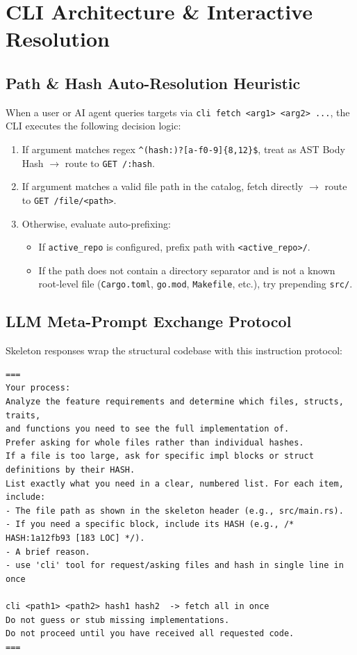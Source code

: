 \documentclass[11pt,a4paper]{article}
\begin{document}
\section{CLI Architecture \& Interactive Resolution}

\subsection{Path \& Hash Auto-Resolution Heuristic}
When a user or AI agent queries targets via \texttt{cli fetch <arg1> <arg2> ...}, the CLI executes the following decision logic:

\begin{enumerate}
    \item If argument matches regex \texttt{\textasciicircum(hash:)?[a-f0-9]\{8,12\}\$}, treat as AST Body Hash $\to$ route to \texttt{GET /:hash}.
    \item If argument matches a valid file path in the catalog, fetch directly $\to$ route to \texttt{GET /file/<path>}.
    \item Otherwise, evaluate auto-prefixing:
    \begin{itemize}
        \item If \texttt{active\_repo} is configured, prefix path with \texttt{<active\_repo>/}.
        \item If the path does not contain a directory separator and is not a known root-level file (\texttt{Cargo.toml}, \texttt{go.mod}, \texttt{Makefile}, etc.), try prepending \texttt{src/}.
    \end{itemize}
\end{enumerate}

\subsection{LLM Meta-Prompt Exchange Protocol}
Skeleton responses wrap the structural codebase with this instruction protocol:
\begin{lstlisting}[style=bashstyle]
===
Your process:
Analyze the feature requirements and determine which files, structs, traits, 
and functions you need to see the full implementation of.
Prefer asking for whole files rather than individual hashes.
If a file is too large, ask for specific impl blocks or struct definitions by their HASH.
List exactly what you need in a clear, numbered list. For each item, include:
- The file path as shown in the skeleton header (e.g., src/main.rs).
- If you need a specific block, include its HASH (e.g., /* HASH:1a12fb93 [183 LOC] */).
- A brief reason.
- use 'cli' tool for request/asking files and hash in single line in once

cli <path1> <path2> hash1 hash2  -> fetch all in once
Do not guess or stub missing implementations.
Do not proceed until you have received all requested code.
===
\end{lstlisting}
\end{document}
